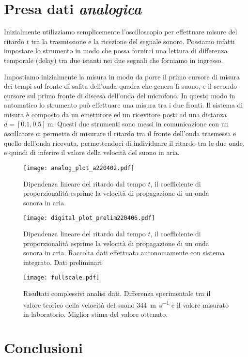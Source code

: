 \documentclass[
    rmp,
    reprint, 
    superscriptaddress, 
    altaffilletter, 
    amsmath, 
    amssymb, 
    a4paper, 
    fleqn]{revtex4-2}
\begin{document}
\section{Presa dati \emph{analogica}}

Inizialmente utilizziamo semplicemente l'oscilloscopio per effettuare misure del ritardo $t$ tra la trasmissione e la ricezione del segnale sonoro. Possiamo infatti impostare lo strumento in modo che possa fornirci una lettura di differenza temporale (delay) tra due istanti nei due segnali che forniamo in ingresso. 

Impostiamo inizialmente la misura in modo da porre il primo cursore di misura dei tempi sul fronte di salita dell'onda quadra che genera li suono, e il secondo cursore sul primo fronte di discesa dell'onda del microfono. In questo modo in automatico lo strumento può effettuare una misura tra i due fronti. 
Il sistema di misura è composto da un emettitore ed un ricevitore posti ad una distanza $d=[0.1, 0.5]~\si{\metre}$. Questi due strumenti sono messi in comunicazione con un oscillatore ci permette di misurare il ritardo tra il fronte dell'onda trasmessa e quello dell'onda ricevuta, permettendoci di individuare il ritardo tra le due onde, e quindi di inferire il valore della velocità del suono in aria. 

\begin{figure}[b]
    \centering
    \texttt{[image: analog\_plot\_a220402.pdf]}
    \caption{Dipendenza lineare del ritardo dal tempo $t$, il coefficiente di proporzionalità esprime la velocità di propagazione di un onda sonora in aria.}\label{fig:analog_plot_d1}
\end{figure}

\begin{figure}
    \centering
    \texttt{[image: digital\_plot\_prelim220406.pdf]}
    \caption{Dipendenza lineare del ritardo dal tempo $t$, il coefficiente di proporzionalità esprime la velocità di propagazione di un onda sonora in aria. Raccolta dati effettuata autonomamente con sistema integrato. Dati preliminari}\label{fig:digital_plot_d2}
\end{figure}

\begin{figure}
    \centering
    \texttt{[image: fullscale.pdf]}
    \caption{Risultati complessivi analisi dati. Differenza sperimentale tra il valore teorico della velocità del suono \SI{344}{\metre\per\second} e il valore misurato in laboratorio. Miglior stima del valore ottenuto. }
\end{figure}


\section{Conclusioni}


\appendix

\setcounter{table}{0}
\renewcommand{\thetable}{A-\Roman{table}}
\end{document}
